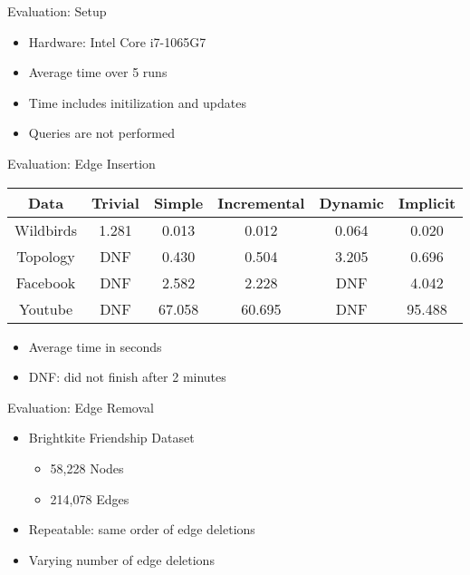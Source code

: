 \documentclass{beamer}
\begin{document}
\begin{frame}{Evaluation: Setup}
  \begin{itemize}
    \item Hardware: Intel Core i7-1065G7
    \item Average time over 5 runs
    \item Time includes initilization and updates
    \item Queries are not performed
      \bigskip
  \end{itemize}
\end{frame}


\begin{frame}{Evaluation: Edge Insertion}
  \begin{table}[]
  \begin{tabular}{|c|c|c|c|c|c|}
    \hline
    Data & Trivial & Simple & Incremental & Dynamic & Implicit \\
    \hline
    \hline
    Wildbirds & 1.281 & 0.013 & 0.012 & 0.064 & 0.020 \\
    \hline
    Topology & DNF & 0.430 & 0.504 & 3.205 & 0.696 \\
    \hline
    Facebook & DNF & 2.582 & 2.228 & DNF & 4.042 \\
    \hline
    Youtube & DNF & 67.058 & 60.695 & DNF & 95.488 \\
    \hline
  \end{tabular}
  \end{table}
  \begin{itemize}
    \item Average time in seconds
    \item DNF: did not finish after 2 minutes
  \end{itemize}
\end{frame}


\begin{frame}{Evaluation: Edge Removal}
  \begin{itemize}
    \item Brightkite Friendship Dataset
      \begin{itemize}
        \item 58,228 Nodes
        \item 214,078 Edges
      \end{itemize}
    \item Repeatable: same order of edge deletions
    \item Varying number of edge deletions
  \end{itemize}
\end{frame}
\end{document}

